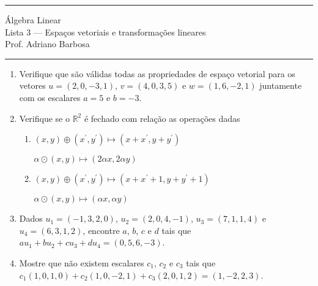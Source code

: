 \documentclass{article}
\begin{document}
\noindent{}\rule{\textwidth}{0.4pt}
\begin{center}
	\'{A}lgebra Linear\\
	Lista 3 --- Espa\c{c}os vetoriais e transforma\c{c}\~oes lineares \\
	\vspace{0.2cm}
	Prof. Adriano Barbosa
\end{center}
\noindent{}\rule{\textwidth}{0.4pt}

\begin{enumerate}
\item Verifique que s\~ao v\'alidas todas as propriedades de espa\c{c}o vetorial para
	os vetores $u = (2, 0, -3, 1)$, $v = (4, 0, 3, 5)$ e $w = (1, 6, -2, 1)$
	juntamente com os escalares $a = 5$ e $b = -3$.

\item Verifique se o $\mathbb{R}^2$ \'e fechado com rela\c{c}\~ao as opera\c{c}\~oes dadas
	\begin{enumerate}
		\item $(x, y) \oplus (x^{'}, y^{'}) \mapsto (x+x^{'}, y+y^{'})$

			$\alpha\odot(x, y) \mapsto (2\alpha x, 2\alpha y)$
		\item $(x, y) \oplus (x^{'}, y^{'}) \mapsto (x+x^{'}+1, y+y^{'}+1)$

			$\alpha\odot(x, y) \mapsto (\alpha x, \alpha y)$
	\end{enumerate}

\item Dados $u_1 = (-1, 3, 2, 0)$, $u_2 = (2, 0, 4, -1)$, $u_3 = (7, 1, 1, 4)$
	e $u_4 = (6, 3, 1, 2)$, encontre $a$, $b$, $c$ e $d$ tais que
	$au_1+bu_2+cu_3+du_4 = (0, 5, 6, -3)$.

\item Mostre que n\~ao existem escalares $c_1$, $c_2$ e $c_3$ tais que $c_1(1, 0,
	1,0) + c_2(1, 0, -2, 1) + c_3(2, 0, 1, 2) = (1, -2, 2, 3)$.


\end{enumerate}
\end{document}

